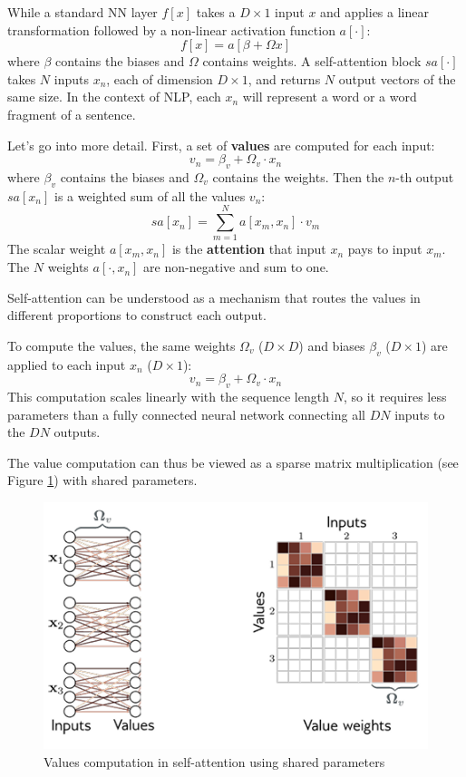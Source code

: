 While a standard NN layer $f[x]$ takes a $D\times 1$ input $x$ and applies a
linear transformation followed by a non-linear activation function $a[\cdot]$:
\begin{equation*}
    f[x] = a[\beta + \Omega x]
\end{equation*}
where $\beta$ contains the biases and $\Omega$ contains weights. A self-attention
block $sa[\cdot]$ takes $N$ inputs $x_n$, each of dimension $D \times 1$, and
returns $N$ output vectors of the same size. In the context of NLP, each $x_n$
will represent a word or a word fragment of a sentence.

Let's go into more detail. First, a set of \textbf{values} are computed for each
input:
\begin{equation}
    v_n = \beta_v + \Omega_v \cdot x_n
\end{equation}
where $\beta_v$ contains the biases and $\Omega_v$ contains the weights. Then the
$n$-th output $sa[x_n]$ is a weighted sum of all the values $v_n$:
\begin{equation}
    sa[x_n] = \sum_{m = 1}^N a[x_m, x_n] \cdot v_m
\end{equation}
The scalar weight $a[x_m, x_n]$ is the \textbf{attention} that input $x_n$ pays
to input $x_m$. The $N$ weights $a[\cdot, x_n]$ are non-negative and sum to one.

Self-attention can be understood as a mechanism that routes the values in different
proportions to construct each output.

To compute the values, the same weights $\Omega_v$ ($D \times D$) and biases
$\beta_v$ ($D \times 1$) are applied to each input $x_n$ ($D \times 1$):
\begin{equation}
    v_n = \beta_v + \Omega_v \cdot x_n
\end{equation}
This computation scales linearly with the sequence length $N$, so it requires less
parameters than a fully connected neural network connecting all $DN$ inputs to
the $DN$ outputs.

The value computation can thus be viewed as a sparse matrix multiplication (see
Figure \ref{fig:valuesComputation}) with shared parameters.
\begin{figure}[!ht]
    \centering
    \includegraphics[width=0.5\linewidth]{img/transformer/values.png}
    \caption{Values computation in self-attention using shared parameters}
    \label{fig:valuesComputation}
\end{figure}

